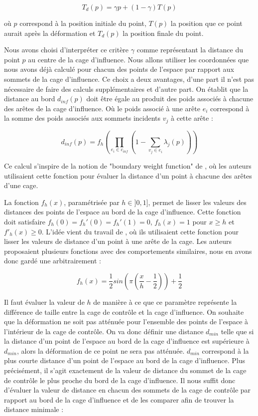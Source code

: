 \begin{equation}
  T_{d}(p) = \gamma p + (1-\gamma) T(p)
\end{equation}

où $p$ correspond à la position initiale du point, $T(p)$ la position que ce
point aurait après la déformation et $T_{d}(p)$ la position finale du point.

Nous avons choisi d'interpréter ce critère $\gamma$ comme représentant la
distance du point $p$ au centre de la cage d'influence. Nous allons utiliser
les coordonnées que nous avons déjà calculé pour chacun des points de l'espace
par rapport aux sommets de la cage d'influence. Ce choix a deux avantages,
d'une part il n'est pas nécessaire de faire des calculs supplémentaires et
d'autre part. On établit que la distance au bord $d_{inf}(p)$ doit être égale
au produit des poids associés à chacune des arêtes de la cage d'influence. Où
le poids associé à une arête $e_i$ correspond à la somme des poids associés
aux sommets incidents $v_j$ à cette arête :

\begin{equation}
  d_{inf}(p) = f_h( \prod_{e_i \in c_{inf}} (1 - \sum_{v_j \in e_i} \lambda_j(p)))
\end{equation}

Ce calcul s'inspire de la notion de "boundary weight function" de
\cite{GPCP13}, où les auteurs utilisaient cette fonction pour évaluer la
distance d'un point à chacune des arêtes d'une cage.

La fonction $f_h(x)$, paramétrisée par $h \in ]0, 1]$, permet de lisser les
valeurs des distances des points de l'espace au bord de la cage d'influence.
Cette fonction doit satisfaire $f_h(0) = f_h'(0) = f_h'(1) = 0$, $f_h(x)=1$
pour $x \geq h$ et $f'_h(x) \geq 0$. L'idée vient du travail de \cite{GPCP13},
où ils utilisaient cette fonction pour lisser les valeurs de distance d'un
point à une arête de la cage. Les auteurs proposaient plusieurs fonctions avec
des comportements similaires, nous en avons donc gardé une arbitrairement :

\begin{equation}
  f_h(x) = \frac{1}{2} sin(\pi(\frac{x}{h} - \frac{1}{2})) + \frac{1}{2}
\end{equation}

Il faut évaluer la valeur de $h$ de manière à ce que ce paramètre représente
la différence de taille entre la cage de contrôle et la cage d'influence. On
souhaite que la déformation ne soit pas atténuée pour l'ensemble des points de
l'espace à l'intérieur de la cage de contrôle. On va donc définir une distance
$d_{min}$ telle que si la distance d'un point de l'espace au bord de la cage
d'influence est supérieure à $d_{min}$, alors la déformation de ce point ne
sera pas atténuée. $d_{min}$ correspond à la plus courte distance d'un point
de l'espace au bord de la cage d'influence. Plus précisément, il s'agit
exactement de la valeur de distance du sommet de la cage de contrôle le plus
proche du bord de la cage d'influence. Il nous suffit donc d'évaluer la valeur
de distance en chacun des sommets de la cage de contrôle par rapport au bord
de la cage d'influence et de les comparer afin de trouver la distance minimale
:

